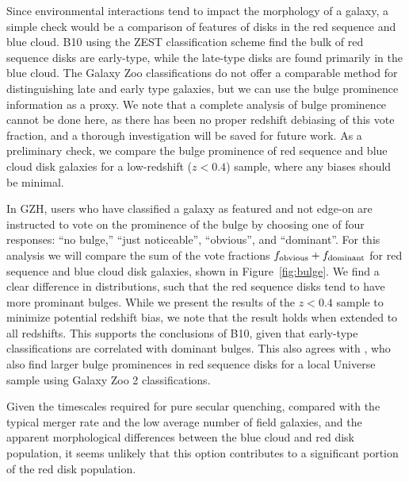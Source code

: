\documentclass[useAMS,usenatbib]{mn2e}
\begin{document}
Since environmental interactions tend to impact the morphology of a galaxy, a simple check would be a comparison of features of disks in the red sequence and blue cloud. B10 using the ZEST classification scheme find the bulk of red sequence disks are early-type, while the late-type disks are found primarily in the blue cloud. The Galaxy Zoo classifications do not offer a comparable method for distinguishing late and early type galaxies, but we can use the bulge prominence information as a proxy. We note that a complete analysis of bulge prominence cannot be done here, as there has been no proper redshift debiasing of this vote fraction, and a thorough investigation will be saved for future work. As a preliminary check, we compare the bulge prominence of red sequence and blue cloud disk galaxies for a low-redshift ($z<0.4$) sample, where any biases should be minimal. 

In GZH, users who have classified a galaxy as featured and not edge-on are instructed to vote on the prominence of the bulge by choosing one of four responses: ``no bulge,'' ``just noticeable'', ``obvious'', and ``dominant''. For this analysis we will compare the sum of the vote fractions $f_{\rm obvious} + f_{\rm dominant}$ for red sequence and blue cloud disk galaxies, shown in Figure~\ref{fig:bulge}. We find a clear difference in distributions, such that the red sequence disks tend to have more prominant bulges. While we present the results of the $z<0.4$ sample to minimize potential redshift bias, we note that the result holds when extended to all redshifts. This supports the conclusions of B10, given that early-type classifications are correlated with dominant bulges. This also agrees with \citet{Masters2010}, who also find larger bulge prominences in red sequence disks for a local Universe sample using Galaxy Zoo 2 classifications.

Given the timescales required for pure secular quenching, compared with the typical merger rate and the low average number of field galaxies, and the apparent morphological differences between the blue cloud and red disk population, it seems unlikely that this option contributes to a significant portion of the red disk population.  
\end{document}

